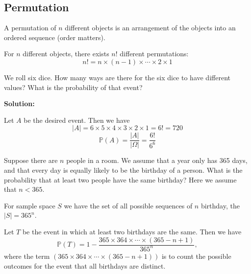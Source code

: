 \subsection{Permutation}

\begin{definition}[Permutation]
    A permutation of \(n\) different objects is an arrangement of the objects into an ordered sequence (order matters).
\end{definition}

\begin{proposition}
    For \(n\) different objects, there exists \(n!\) different permutations:
    \[
        n! = n \times (n-1) \times \cdots \times 2 \times 1
    \]
\end{proposition}

\begin{eg}
    We roll six dice. How many ways are there for the six dice to have different values? What is the probability of that event?
    
    \textbf{Solution:}
    
    Let \(A\) be the desired event. Then we have
    \[
        \vert A \vert = 6 \times 5 \times 4 \times 3 \times 2 \times 1 = 6! = 720
    \]
    \[
        \mathbb{P}(A) = \dfrac{\vert A \vert }{\vert \Omega \vert } = \dfrac{6!}{6^6}
    \]
\end{eg}

\begin{eg}
    Suppose there are \(n\) people in a room. We assume that a year only has 365 days, and that every day is equally likely to be the birthday of a person. What is the probability that at least two people have the same birthday? Here we assume that \(n < 365\). 

    For sample space \(S\) we have the set of all possible sequences of \(n\) birthday, the \(\vert S \vert = 365^n\). 

    Let \(T\) be the event in which at least two birthdays are the same. Then we have
    \[
        \mathbb{P}(T) = 1 - \dfrac{365 \times 364 \times \cdots \times (365 - n + 1)}{365^n},
    \]
    where the term \((365 \times 364 \times \cdots \times (365 - n + 1))\) is to count the possible outcomes for the event that all birthdays are distinct.
\end{eg}


